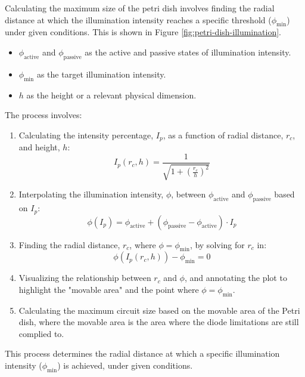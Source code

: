 Calculating the maximum size of the petri dish involves finding the radial distance at which the illumination intensity reaches a specific threshold (\(\phi_{\text{min}}\)) under given conditions. 
This is shown in Figure \ref{fig:petri-dish-illumination}.
\begin{itemize}
    \item \( \phi_{\text{active}} \) and \( \phi_{\text{passive}} \) as the active and passive states of illumination intensity.
    \item \( \phi_{\text{min}} \) as the target illumination intensity.
    \item \( h \) as the height or a relevant physical dimension.
\end{itemize}
The process involves:
\begin{enumerate}
    \item Calculating the intensity percentage, \(I_p\), as a function of radial distance, \(r_c\), and height, \(h\):
    \[I_p(r_c, h) = \frac{1}{\sqrt{1 + \left(\frac{r_c}{h}\right)^2}}\]

    \item Interpolating the illumination intensity, \(\phi\), between \(\phi_{\text{active}}\) and \(\phi_{\text{passive}}\) based on \(I_p\):
    \[\phi(I_p) = \phi_{\text{active}} + (\phi_{\text{passive}} - \phi_{\text{active}}) \cdot I_p\]

    \item Finding the radial distance, \(r_c\), where \(\phi = \phi_{\text{min}}\), by solving for \(r_c\) in:
    \[\phi(I_p(r_c, h)) - \phi_{\text{min}} = 0\]

    \item Visualizing the relationship between \(r_c\) and \(\phi\), and annotating the plot to highlight the "movable area" and the point where \(\phi = \phi_{\text{min}}\).
    \item Calculating the maximum circuit size based on the movable area of the Petri dish, where the movable area is 
    the area where the diode limitations are still complied to.
\end{enumerate}

This process determines the radial distance at which a specific illumination intensity (\(\phi_{\text{min}}\)) is achieved, under given conditions.

